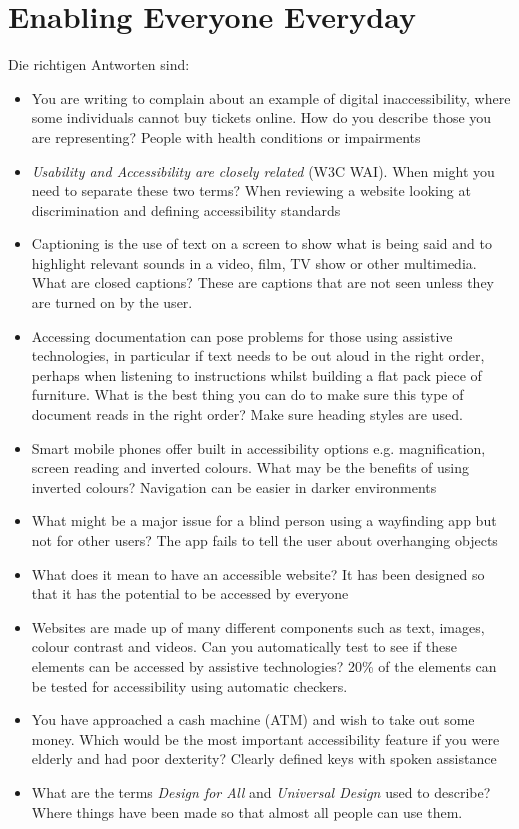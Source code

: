 \documentclass{article}
\begin{document}
	\section*{Enabling Everyone Everyday}
	Die richtigen Antworten sind:
	\begin{itemize}
		\item You are writing to complain about an example of digital inaccessibility, where some individuals cannot buy tickets online.  How do you describe those you are representing? \textcolor{green!90!black}{People with health conditions or impairments}
		\item \textit{Usability and Accessibility are closely related} (W3C WAI).  When might you need to separate these two terms? \textcolor{green!90!black}{When reviewing a website looking at discrimination and defining accessibility standards}
		\item Captioning is the use of text on a screen to show what is being said and to highlight relevant sounds in a video, film, TV show or other multimedia. What are closed captions? \textcolor{green!90!black}{These are captions that are not seen unless they are turned on by the user.}
		\item Accessing documentation can pose problems for those using assistive technologies, in particular if text needs to be out aloud in the right order, perhaps when listening to instructions whilst building a flat pack piece of furniture.  What is the best thing you can do to make sure this type of document reads in the right order? \textcolor{green!90!black}{Make sure heading styles are used.}
		\item Smart mobile phones offer built in accessibility options e.g. magnification, screen reading and inverted colours.  What may be the benefits of using inverted colours? \textcolor{green!90!black}{Navigation can be easier in darker environments}
		\item What might be a major issue for a blind person using a wayfinding app but not for other users? \textcolor{green!90!black}{The app fails to tell the user about overhanging objects}
		\item What does it mean to have an accessible website? \textcolor{green!90!black}{It has been designed so that it has the potential to be accessed by everyone}
		\item Websites are made up of many different components such as text, images, colour contrast and videos.  Can you automatically test to see if these elements can be accessed by assistive technologies? \textcolor{green!90!black}{20\% of the elements can be tested for accessibility using automatic checkers.}
		\item You have approached a cash machine (ATM) and wish to take out some money.  Which would be the most important accessibility feature if you were elderly and had poor dexterity? \textcolor{green!90!black}{Clearly defined keys with spoken assistance}
		\item What are the terms \textit{Design for All} and \textit{Universal Design} used to describe? \textcolor{green!90!black}{Where things have been made so that almost all people can use them.}
	\end{itemize}
	
\end{document}
